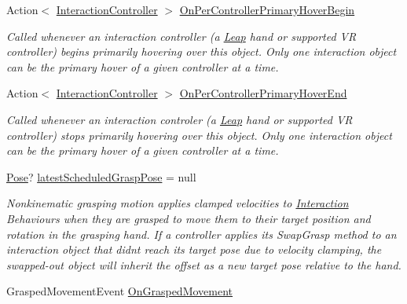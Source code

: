 \begin{DoxyCompactItemize}
Action$<$ \mbox{\hyperlink{class_leap_1_1_unity_1_1_interaction_1_1_interaction_controller}{Interaction\+Controller}} $>$ \mbox{\hyperlink{class_leap_1_1_unity_1_1_interaction_1_1_interaction_behaviour_a77282ddce732330c800e17a8f97686d0}{On\+Per\+Controller\+Primary\+Hover\+Begin}}
\begin{DoxyCompactList}\small\item\em Called whenever an interaction controller (a \mbox{\hyperlink{namespace_leap_1_1_unity_1_1_leap}{Leap}} hand or supported VR controller) begins primarily hovering over this object. Only one interaction object can be the primary hover of a given controller at a time. \end{DoxyCompactList}\item 
Action$<$ \mbox{\hyperlink{class_leap_1_1_unity_1_1_interaction_1_1_interaction_controller}{Interaction\+Controller}} $>$ \mbox{\hyperlink{class_leap_1_1_unity_1_1_interaction_1_1_interaction_behaviour_a4cbf311d8cede813d39dcdfddc6d5582}{On\+Per\+Controller\+Primary\+Hover\+End}}
\begin{DoxyCompactList}\small\item\em Called whenever an interaction controler (a \mbox{\hyperlink{namespace_leap_1_1_unity_1_1_leap}{Leap}} hand or supported VR controller) stops primarily hovering over this object. Only one interaction object can be the primary hover of a given controller at a time. \end{DoxyCompactList}\item 
\mbox{\hyperlink{struct_leap_1_1_unity_1_1_pose}{Pose}}? \mbox{\hyperlink{class_leap_1_1_unity_1_1_interaction_1_1_interaction_behaviour_a0073161fe1a5a4cd29b71a203fc6b2c5}{latest\+Scheduled\+Grasp\+Pose}} = null
\begin{DoxyCompactList}\small\item\em Nonkinematic grasping motion applies clamped velocities to \mbox{\hyperlink{namespace_leap_1_1_unity_1_1_interaction}{Interaction}} Behaviours when they are grasped to move them to their target position and rotation in the grasping hand. If a controller applies its Swap\+Grasp method to an interaction object that didn\textquotesingle{}t reach its target pose due to velocity clamping, the swapped-\/out object will inherit the offset as a new target pose relative to the hand. \end{DoxyCompactList}\item 
Grasped\+Movement\+Event \mbox{\hyperlink{class_leap_1_1_unity_1_1_interaction_1_1_interaction_behaviour_aac5b0f2f21a26369d70314363e18af3f}{On\+Grasped\+Movement}}

\end{DoxyCompactItemize}
